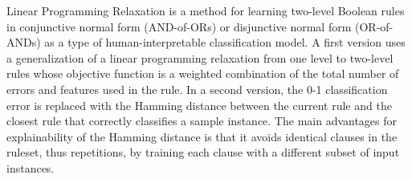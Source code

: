 \documentclass[final,1p,times]{elsarticle}
\begin{document}
Linear Programming Relaxation \cite{malioutov2017learning, su2016interpretable} is a method for learning two-level Boolean rules in conjunctive normal form (AND-of-ORs) or disjunctive normal form (OR-of-ANDs) as a type of human-interpretable classification model. A  first version uses a generalization of a linear programming relaxation from one level to two-level rules whose objective function is a weighted combination of the total number of errors and features used in the rule. In a second version, the 0-1 classification error is replaced with the Hamming distance between the current rule and the closest rule that correctly classifies a sample instance. The main advantages for explainability of the Hamming distance is that it avoids identical clauses in the ruleset, thus repetitions, by training each clause with a different subset of input instances.\\
\end{document}
